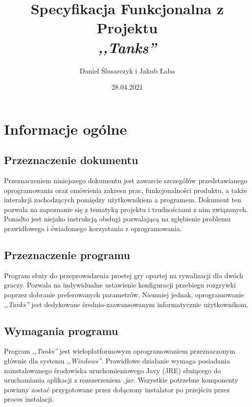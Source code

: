 \documentclass[11pt,a4paper]{report}
\title{\Huge Specyfikacja Funkcjonalna z Projektu\\\textsl{,,Tanks''}}
\author{Daniel Ślusarczyk i Jakub Łaba}
\date{28.04.2021}
\begin{document}
\maketitle

\renewcommand*\thesection{\arabic{section}} 


\pagestyle{fancy}
\fancyhf{}
\setcounter{page}{0}

{
\fancyhead{} 
\fancyfoot{} 
}
\thispagestyle{empty} 
\tableofcontents 
\thispagestyle{empty}
\newpage

{
\fancyhead{} 
\fancyfoot[C]{\thepage}
}


\section{Informacje ogólne}\label{sec:tekst}
\subsection {Przeznaczenie dokumentu}
Przeznaczeniem niniejszego dokumentu jest zawarcie szczegółów przedstawianego oprogramowania oraz omówienia zakresu prac, funkcjonalności produktu, a także interakcji zachodzących pomiędzy użytkownikiem a programem. Dokument ten pozwala na zapoznanie się z tematyką projektu i trudnościami z nim związanych. Ponadto jest niejako instrukcją obsługi pozwalającą na zgłębienie problemu prawidłowego i świadomego korzystania z oprogramowania. 

\subsection {Przeznaczenie programu}
Program służy do przeprowadzenia prostej gry opartej na rywalizacji dla dwóch graczy. Pozwala na indywidualne ustawienie konfiguracji przebiegu rozgrywki poprzez dobranie preferowanych parametrów. Niemniej jednak, oprogramowanie \textsl{,,Tanks''} jest dedykowane średnio-zaawansowanym informatycznie użytkownikom.

\subsection {Wymagania programu}
Program \textsl{,,Tanks''} jest wieloplatformowym oprogramowaniem przeznaczonym głównie dla systemu \textsl{,,Windows''}.  Prawidłowe działanie wymaga posiadania zainstalowanego środowiska uruchomieniowego Javy (JRE) służącego do uruchamiania aplikacji z rozszerzeniem \textsl{.jar}. Wszystkie potrzebne komponenty powinny zostać przygotowane przez dołączony instalator po przejściu przez proces instalacji.
\end{document}
